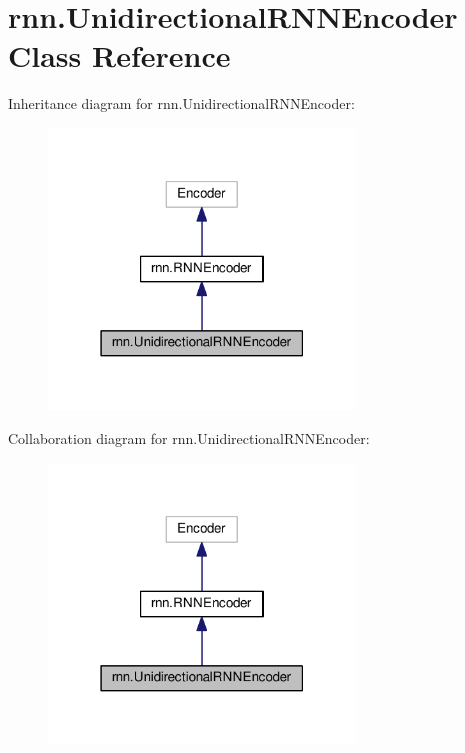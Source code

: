 \hypertarget{classrnn_1_1UnidirectionalRNNEncoder}{}\section{rnn.\+Unidirectional\+R\+N\+N\+Encoder Class Reference}
\label{classrnn_1_1UnidirectionalRNNEncoder}


Inheritance diagram for rnn.\+Unidirectional\+R\+N\+N\+Encoder\+:
\nopagebreak
\begin{figure}[H]
\begin{center}
\leavevmode
\includegraphics[width=231pt]{classrnn_1_1UnidirectionalRNNEncoder__inherit__graph}
\end{center}
\end{figure}


Collaboration diagram for rnn.\+Unidirectional\+R\+N\+N\+Encoder\+:
\nopagebreak
\begin{figure}[H]
\begin{center}
\leavevmode
\includegraphics[width=231pt]{classrnn_1_1UnidirectionalRNNEncoder__coll__graph}
\end{center}
\end{figure}
